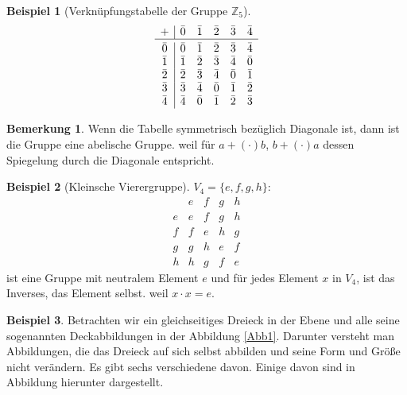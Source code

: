 \documentclass{article}
\theoremstyle{definition}
\newtheorem{bem}[definition]{Bemerkung}
\newtheorem*{bei*}{Beispiel}
\theoremstyle{plain}
\begin{document}
\begin{bei*}[Verkn\"upfungstabelle der Gruppe $ \mathbb{Z}_5 $]
	\[ 
	\begin{array}{c|ccccc}
		+ & \bar{0} & \bar{1} & \bar{2} & \bar{3} & \bar{4} \\\hline \noalign{\vskip1mm}
  \bar{0} & \bar{0} & \bar{1} & \bar{2} & \bar{3} & \bar{4} \\ 
  \bar{1} & \bar{1} & \bar{2} & \bar{3} & \bar{4} & \bar{0} \\
  \bar{2} & \bar{2} & \bar{3} & \bar{4} & \bar{0} & \bar{1} \\
  \bar{3} & \bar{3} & \bar{4} & \bar{0} & \bar{1} & \bar{2} \\
  \bar{4} & \bar{4} & \bar{0} & \bar{1} & \bar{2} & \bar{3} \\
	\end{array}
	 \]
\end{bei*}
\begin{bem}
	Wenn die Tabelle symmetrisch bez\"uglich Diagonale ist, dann ist die Gruppe eine abelische Gruppe. weil f\"ur $ a {+}{(\cdot)} b $, $ b {+}{(\cdot)} a $ dessen Spiegelung durch die Diagonale entspricht. 
\end{bem}
\begin{bei*}[Kleinsche Vierergruppe]
	$ V_4 = \{ e,f,g,h \} $:
	\[ 
	\begin{array}{c|cccc}
		& e & f & g & h \\ \hline
	e	& e & f & g & h \\
	f	& f & e & h & g \\
	g	& g & h & e & f \\
	h	& h & g & f & e	
	\end{array}
	 \]
	ist eine Gruppe mit neutralem Element $ e $ und f\"ur jedes Element $ x $ in $ V_4 $, ist das Inverses, das Element selbst. weil $ x\cdot x = e $.
\end{bei*}
\begin{bei*}
	Betrachten wir ein gleichseitiges Dreieck in der Ebene und alle seine sogenannten Deckabbildungen  in der Abbildung \ref{Abb1}. Darunter versteht man Abbildungen, die das Dreieck auf sich selbst abbilden und seine Form 	und Gr\"o\ss e nicht ver\"andern. Es gibt sechs verschiedene davon. Einige davon sind in Abbildung hierunter dargestellt.
\end{bei*}
\end{document}
